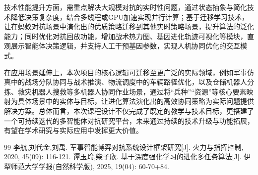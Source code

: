 \documentclass[12pt,a4paper]{article}
\begin{document}
	技术性能提升方面，需重点解决大规模对抗的实时性问题，通过状态抽象与简化技术降低决策复杂度，结合多线程或GPU加速实现并行计算；基于迁移学习技术，让在蚂蚁对抗场景中演化出的优质策略迁移到其他实时策略场景，提升算法的泛化能力；同时优化对抗回放功能，增加战术热力图、基因进化轨迹可视化等模块，直观展示智能体决策逻辑，并支持人工干预基因参数，实现人机协同优化的交互模式。
	
	在应用场景延伸上，本次项目的核心逻辑可迁移至更广泛的实际领域，例如军事仿真中的战场分队协同与战术推演、物流调度中的车辆路径优化，以及仓储机器人分拣、救灾机器人搜救等多机器人协同作业场景，通过将“兵种”“资源”等核心要素映射为具体场景中的实体与目标，让进化算法演化出的高效协同策略为实际问题提供解决方案。总体而言，本次课程设计不仅完成了既定的教学与技术目标，更搭建了一个可持续迭代的多智能体对抗研究平台，未来通过持续的技术升级与功能拓展，有望在学术研究与实际应用中发挥更大价值。
	
	\begin{thebibliography}{99}
		 李航,刘代金,刘禹. 军事智能博弈对抗系统设计框架研究[J]. 火力与指挥控制, 2020, 45(09): 116-121.
		 谭玉玲,柴子欣. 基于深度强化学习的进化多任务算法[J]. 伊犁师范大学学报(自然科学版), 2025, 19(04): 60-70+84.
	\end{thebibliography}
	
\end{document}
